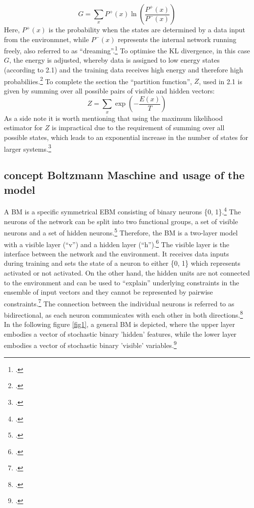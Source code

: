 \begin{equation}
    G = \sum_x P^+(x) \ln \left( \frac{P^+(x)}{P^-(x)} \right)
\end{equation}
Here, \(P^+(x)\) is the probability when the states are determined by a data input from the environmnet, while \(P^-(x)\) represents the internal network running freely, also referred to as ``dreaming''.\footcite[Vgl.][154-155]{ackleyLearningAlgorithmBoltzmann1985}
To optimise the KL divergence, in this case \( G \), the energy is adjusted, whereby data is assigned to low energy states (according to 2.1) and the training data receives high energy and therefore high probabiliies.\footcite[Vgl.][2-3]{zhaiDeepStructuredEnergy2016}
To complete the section the ``partition function'', \( Z \), used in 2.1 is given by summing over all possible pairs of visible and hidden vectors:
\begin{equation}
    Z = \sum_x \exp\left(-\frac{E(x)}{T}\right)
\end{equation}
As a side note it is worth mentioning that using the maximum likelihood estimator for \( Z \) is impractical due to the requirement of summing over all possible states, which leads to an exponential increase in the number of states for larger systems.\footcite[Vgl.][2-3]{zhaiDeepStructuredEnergy2016}

\subsection{concept Boltzmann Maschine and usage of the model}

A \ac{BM} is a specific symmetrical \ac{EBM} consisting of binary neurons \{0, 1\}.\footcite[Vgl.][260]{amariInformationGeometryBoltzmann1992}
The neurons of the network can be split into two functional groups, a set of visible neurons and a set of hidden neurons.\footcite[Vgl.][154]{ackleyLearningAlgorithmBoltzmann1985}
Therefore, the \ac{BM} is a two-layer model with a visible layer (``v'') and a hidden layer (``h'').\footcite[Vgl.][448]{salakhutdinovDeepBoltzmannMachines2009}
The visible layer is the interface between the network and the environment. It receives data inputs during training and sets the state of a neuron to either \{0, 1\} which represents activated or not activated.
On the other hand, the hidden units are not connected to the environment and can be used to “explain” underlying constraints in the ensemble of input vectors and they cannot be represented by pairwise constraints.\footcite[Vgl.][154]{ackleyLearningAlgorithmBoltzmann1985}
The connection between the individual neurons is referred to as bidirectional, as each neuron communicates with each other in both directions.\footcite[Vgl.][149]{ackleyLearningAlgorithmBoltzmann1985}
In the following figure \ref{fig1}, a general \ac{BM} is depicted, where the upper layer embodies a vector of stochastic binary 'hidden' features, while the lower layer embodies a vector of stochastic binary 'visible' variables.\footcite[Vgl.][449]{salakhutdinovDeepBoltzmannMachines2009}


